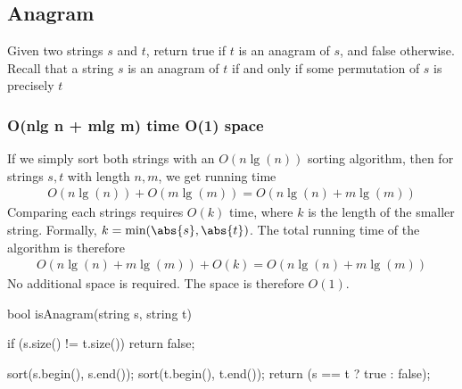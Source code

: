 \documentclass{report}
\begin{document}
    \bigbreak \noindent 
    \subsection{Anagram}
    \bigbreak \noindent 
    Given two strings $s$ and $t$, return true if $t$ is an anagram of $s$, and false otherwise. Recall that a string $s$ is an anagram of $t$ if and only if some permutation of $s$ is precisely $t$
    \bigbreak \noindent 
    \subsubsection{O(nlg n + mlg m) time O(1) space}
    \bigbreak \noindent 
    If we simply sort both strings with an $O(n \lg(n))$ sorting algorithm, then for strings $s,t$ with length $n,m$, we get running time
    \begin{align*}
        O(n\lg(n)) + O(m\lg(m)) = O(n\lg(n) + m\lg(m))
    \end{align*}
    \bigbreak \noindent 
    Comparing each strings requires $O(k)$ time, where $k$ is the length of the smaller string. Formally, $k=\text{min}(\abs{s}, \abs{t})$. The total running time of the algorithm is therefore
    \begin{align*}
        O(n\lg(n) + m\lg(m)) + O(k) = O(n\lg(n) + m\lg(m))
    \end{align*}
    \bigbreak \noindent 
    No additional space is required. The space is therefore $O(1)$.
    \bigbreak \noindent 
    \begin{cppcode}
        bool isAnagram(string s, string t) {
            if (s.size() != t.size()) return false;

            sort(s.begin(), s.end()); sort(t.begin(), t.end());
            return (s == t ? true : false);
        }
    \end{cppcode}

    \bigbreak \noindent 
\end{document}
